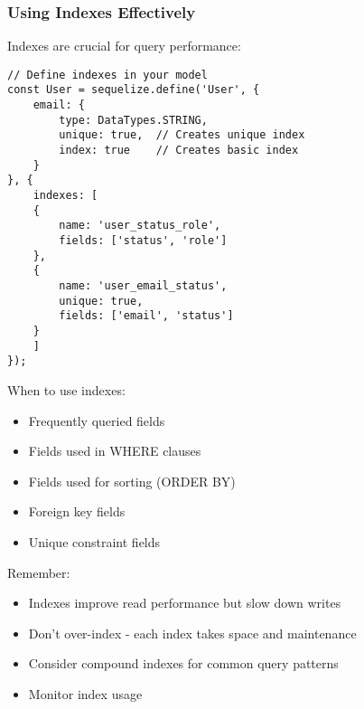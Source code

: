 \documentclass[12pt,a4paper]{book}
\begin{document}
	\subsubsection{Using Indexes Effectively}
	\begin{tcolorbox}[title=Index Optimization]
		Indexes are crucial for query performance:
		
		\begin{verbatim}
// Define indexes in your model
const User = sequelize.define('User', {
	email: {
		type: DataTypes.STRING,
		unique: true,  // Creates unique index
		index: true    // Creates basic index
	}
}, {
	indexes: [
	{
		name: 'user_status_role',
		fields: ['status', 'role']
	},
	{
		name: 'user_email_status',
		unique: true,
		fields: ['email', 'status']
	}
	]
});
		\end{verbatim}
		
		When to use indexes:
		\begin{itemize}
			\item Frequently queried fields
			\item Fields used in WHERE clauses
			\item Fields used for sorting (ORDER BY)
			\item Foreign key fields
			\item Unique constraint fields
		\end{itemize}
		
		Remember:
		\begin{itemize}
			\item Indexes improve read performance but slow down writes
			\item Don't over-index - each index takes space and maintenance
			\item Consider compound indexes for common query patterns
			\item Monitor index usage
		\end{itemize}
	\end{tcolorbox}
	
\end{document}
